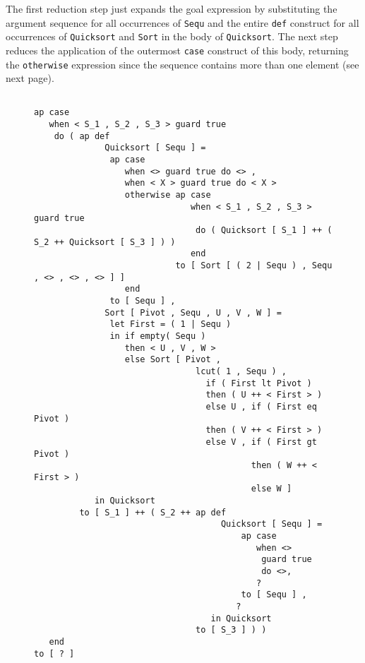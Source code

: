 The first reduction step just expands the goal expression by substituting
 the argument sequence for all occurrences of {\tt Sequ} and the entire
{\tt def} construct for all occurrences of {\tt Quicksort} and {\tt Sort}
in the body of {\tt Quicksort}. The next step reduces the application of the 
outermost {\tt case} construct of this body, returning the {\tt otherwise} expression
since the sequence contains more than one element (see next page).
\begin{figure}
\begin{verbatim}
 
ap case 
   when < S_1 , S_2 , S_3 > guard true
    do ( ap def 
              Quicksort [ Sequ ] =
               ap case 
                  when <> guard true do <> ,
                  when < X > guard true do < X >
                  otherwise ap case 
                               when < S_1 , S_2 , S_3 > guard true
                                do ( Quicksort [ S_1 ] ++ ( S_2 ++ Quicksort [ S_3 ] ) )
                               end
                            to [ Sort [ ( 2 | Sequ ) , Sequ , <> , <> , <> ] ]
                  end
               to [ Sequ ] ,
              Sort [ Pivot , Sequ , U , V , W ] =
               let First = ( 1 | Sequ )
               in if empty( Sequ )
                  then < U , V , W >
                  else Sort [ Pivot ,
                                lcut( 1 , Sequ ) ,
                                  if ( First lt Pivot )
                                  then ( U ++ < First > )
                                  else U , if ( First eq Pivot )
                                  then ( V ++ < First > )
                                  else V , if ( First gt Pivot )
                                           then ( W ++ < First > )
                                           else W ]
            in Quicksort
         to [ S_1 ] ++ ( S_2 ++ ap def 
                                     Quicksort [ Sequ ] = 
                                         ap case
                                            when <>
                                             guard true
                                             do <>,
                                            ?
                                         to [ Sequ ] ,
                                        ?
                                   in Quicksort
                                to [ S_3 ] ) )
   end
to [ ? ]

\end{verbatim}
\end{figure}


